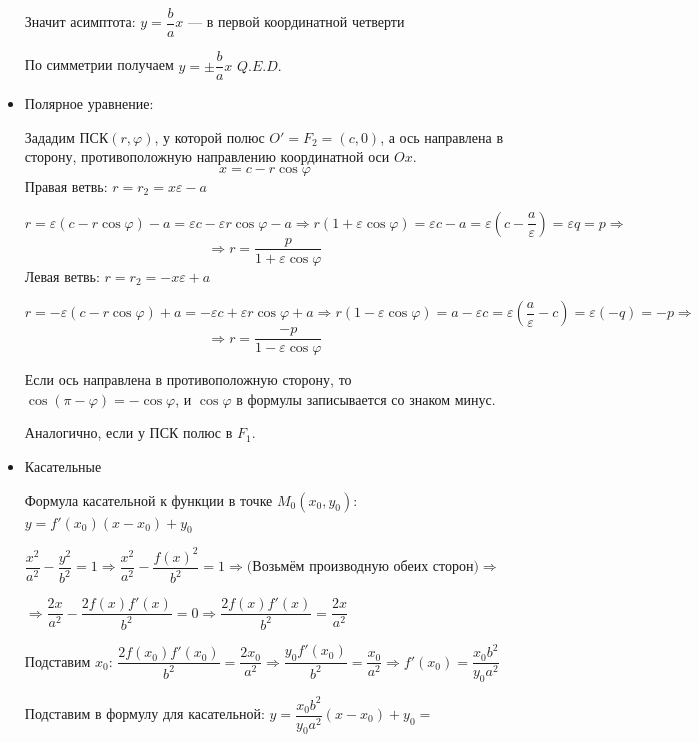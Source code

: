 \begin{itemize}
          Значит асимптота: \(y = \dfrac{b}{a} x\) --- в первой координатной четверти

          По симметрии получаем \(y = \pm \dfrac{b}{a} x\) \(Q.E.D.\)

    \item Полярное уравнение:

          Зададим ПСК\((r, \varphi)\), у которой полюс \(O'= F_2 = (c, 0)\), а ось направлена в сторону, противоположную направлению координатной оси \(Ox\).
          \[x = c - r \cos \varphi\]
          Правая ветвь: \(r = r_2 = x \varepsilon - a\)

          \(r = \varepsilon(c - r \cos \varphi) - a = \varepsilon c - \varepsilon r \cos \varphi - a \Rightarrow r(1 + \varepsilon \cos \varphi) = \varepsilon c - a = \varepsilon \left(c - \dfrac{a}{\varepsilon}\right) = \varepsilon q = p \Rightarrow\)          
          \[ \Rightarrow r = \dfrac{p}{1 + \varepsilon \cos \varphi}\]
          Левая ветвь: \(r = r_2 = - x \varepsilon + a\)

          \(r = - \varepsilon(c - r \cos \varphi) + a = - \varepsilon c + \varepsilon r \cos \varphi + a \Rightarrow r(1 - \varepsilon \cos \varphi) = a - \varepsilon c = \varepsilon \left(\dfrac{a}{\varepsilon} - c\right) = \varepsilon \left(-q \right) = -p \Rightarrow\) \[\Rightarrow r = \dfrac{-p}{1 - \varepsilon \cos \varphi}\]

          Если ось направлена в противоположную сторону, то \(\cos(\pi - \varphi) = - \cos \varphi\), и \(\cos \varphi\) в формулы записывается со знаком минус.

          Аналогично, если у ПСК полюс в \(F_1\).

    \item Касательные

          Формула касательной к функции в точке \(M_0(x_0, y_0)\): \(y = f'(x_0)(x - x_0) + y_0\)

          \(\dfrac{x^2}{a^2} - \dfrac{y^2}{b^2} = 1 \Rightarrow \dfrac{x^2}{a^2} - \dfrac{f(x)^2}{b^2} = 1 \Rightarrow (\)Возьмём производную обеих сторон\() \Rightarrow\)

          \(\Rightarrow \dfrac{2x}{a^2} - \dfrac{2 f(x) f'(x)}{b^2} = 0 \Rightarrow \dfrac{2 f(x) f'(x)}{b^2} = \dfrac{2x}{a^2}\)

          Подставим \(x_0\): \(\dfrac{2 f(x_0) f'(x_0)}{b^2} = \dfrac{2x_0}{a^2} \Rightarrow \dfrac{y_0 f'(x_0)}{b^2} = \dfrac{x_0}{a^2} \Rightarrow f'(x_0) = \dfrac{x_0 b^2}{y_0 a^2}\)

          Подставим в формулу для касательной: \(y = \dfrac{x_0 b^2}{y_0 a^2}(x - x_0) + y_0=\)


\end{itemize}
